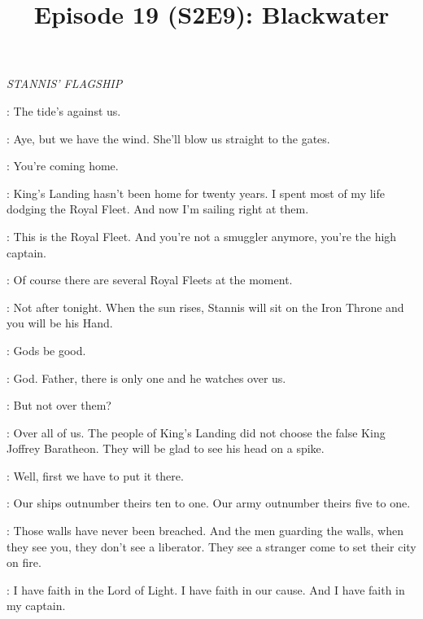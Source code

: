 

\title{Episode 19 (S2E9): Blackwater}
\author{}
\date{}
\maketitle
\newcommand{\SGNS}{\textbf{SERVING GIRL}}
\newcommand{\SERI}{\textbf{SER ILYN}}




\scene

\textit{STANNIS' FLAGSHIP}


\MATTHOS: The tide's against us. 

\DAVOS: Aye, but we have the wind. She'll blow us straight to the gates. 

\MATTHOS: You're coming home. 

\DAVOS: King's Landing hasn't been home for twenty years. I spent most of my life dodging the Royal Fleet. And now I'm sailing right at them. 

\MATTHOS: This is the Royal Fleet.  And you're not a smuggler anymore, you're the high captain. 

\DAVOS: Of course there are several Royal Fleets at the moment. 

\MATTHOS: Not after tonight. When the sun rises, Stannis will sit on the Iron Throne and you will be his Hand. 

\DAVOS: Gods be good. 

\MATTHOS: God. Father, there is only one and he watches over us. 

\DAVOS: But not over them? 

\MATTHOS: Over all of us. The people of King's Landing did not choose the false King Joffrey Baratheon. They will be glad to see his head on a spike. 

\DAVOS: Well, first we have to put it there. 

\MATTHOS: Our ships outnumber theirs ten to one. Our army outnumber theirs five to one. 

\DAVOS: Those walls have never been breached. And the men guarding the walls, when they see you, they don't see a liberator. They see a stranger come to set their city on fire. 

\MATTHOS: I have faith in the Lord of Light. I have faith in our cause. And I have faith in my captain. 


\scene


